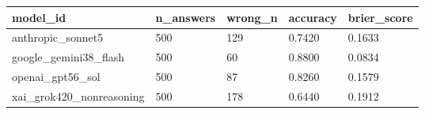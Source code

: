 \begin{tabular}{lllll}
\toprule
model\_id & n\_answers & wrong\_n & accuracy & brier\_score \\
\midrule
anthropic\_sonnet5 & 500 & 129 & 0.7420 & 0.1633 \\
google\_gemini38\_flash & 500 & 60 & 0.8800 & 0.0834 \\
openai\_gpt56\_sol & 500 & 87 & 0.8260 & 0.1579 \\
xai\_grok420\_nonreasoning & 500 & 178 & 0.6440 & 0.1912 \\
\bottomrule
\end{tabular}
